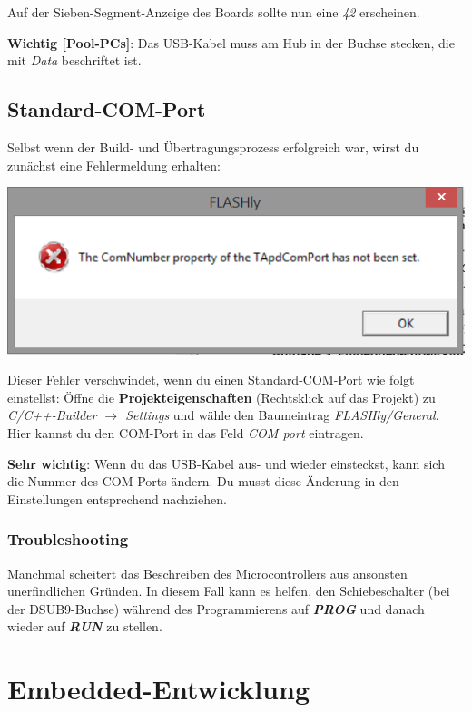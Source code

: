 Auf der Sieben-Segment-Anzeige des Boards sollte nun eine \textit{42} erscheinen.

\textbf{Wichtig [Pool-PCs]}: Das USB-Kabel muss am Hub in der Buchse stecken, die mit \emph{Data} beschriftet ist.

\subsection{Standard-COM-Port}

Selbst wenn der Build- und Übertragungsprozess erfolgreich war, wirst du zunächst eine Fehlermeldung erhalten:
\begin{center}
	\includegraphics[scale=.7]{flashly_dummy_error_message.png}
\end{center}

Dieser Fehler verschwindet, wenn du einen Standard-COM-Port wie folgt einstellst:
Öffne die \textbf{Projekteigenschaften} (Rechtsklick auf das Projekt) zu \emph{C/C++-Builder $\to$ Settings} und wähle den Baumeintrag \emph{FLASHly/General}.
Hier kannst du den COM-Port in das Feld \emph{COM port} eintragen.

\textbf{Sehr wichtig}: Wenn du das USB-Kabel aus- und wieder einsteckst, kann sich die Nummer des COM-Ports ändern.
Du musst diese Änderung in den Einstellungen entsprechend nachziehen.

\subsubsection{Troubleshooting}

Manchmal scheitert das Beschreiben des Microcontrollers aus ansonsten unerfindlichen Gründen.
In diesem Fall kann es helfen, den Schiebeschalter (bei der DSUB9-Buchse) während des Programmierens auf \textbf{\emph{PROG}} und danach wieder auf \textbf{\emph{RUN}} zu stellen.

\section{Embedded-Entwicklung}

